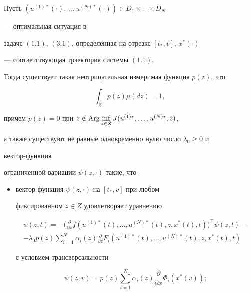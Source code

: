  


\begin{thms} 


Пусть $(u^{(1)*}(\cdot),\dotsc,u^{(N)*}(\cdot))\in 


D_1\times\dotsb\times D_N$ 


--- оптимальная ситуация в 


задаче $(1.1)$, $(3.1)$, определенная на отрезке $[t_*,v]$, $x^*(\cdot)$ 


--- соответствующая траектория системы $(1.1)$. 


Тогда существует такая неотрицательная измеримая функция $p(z)$, что 


$$ 


\int_Z p(z)\mu(dz)=1, 


$$ 


причем $p(z)=0$ при $z\notin\Arg \inf\limits_{z\in Z}J 


(u^{(1)*},\dotsc,u^{(N)*},z)$, 


а также существуют не равные одновременно нулю число $\lambda_0\ge0$ и 


вектор-функция 


ограниченной вариации $\psi(z,\cdot)$ такие, что 


\begin{itemize} 


\item[1)] вектор-функция $\psi(z,\cdot)$ на $[t_*,v]$ при любом 


фиксированном $z\in Z$ удовлетворяет уравнению 


\begin{multline*} 


\Dot\psi(z,t)=-\bigg(\frac{\partial}{\partial x}f 


(u^{(1)*}(t),\dotsc,u^{(N)*}(t),z,x^*(t),t)\bigg)^\top\psi(z,t)-\\ 


-\lambda_0 p(z)\sum^N_{i=1}\alpha_i(z) 


\frac{\partial}{\partial z}F_i 


(u^{(1)*}(t),\dotsc,u^{(N)*}(t),z,x^*(t),t) 


\end{multline*} 


с условием трансверсальности 


$$ 


\psi(z,v)=p(z)\sum^N_{i=1}\alpha_i(z)\frac{\partial}{\partial x} 


\Phi_i(x^*(v)); 


$$ 



\end{itemize}
\end{thms}
